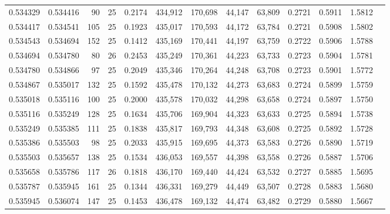 \begin{tabular}{rrrrrrrrrrrrr}
0.534329 & 0.534416 &    90 &  25 &                                     0.2174 & 434,912 & 170,698 &  44,147 &  63,809 & 0.2721 & 0.5911 & 1.5812 \\
0.534417 & 0.534541 &   105 &  25 &                                     0.1923 & 435,017 & 170,593 &  44,172 &  63,784 & 0.2721 & 0.5908 & 1.5802 \\
0.534543 & 0.534694 &   152 &  25 &                                     0.1412 & 435,169 & 170,441 &  44,197 &  63,759 & 0.2722 & 0.5906 & 1.5788 \\
0.534694 & 0.534780 &    80 &  26 &                                     0.2453 & 435,249 & 170,361 &  44,223 &  63,733 & 0.2723 & 0.5904 & 1.5781 \\
0.534780 & 0.534866 &    97 &  25 &                                     0.2049 & 435,346 & 170,264 &  44,248 &  63,708 & 0.2723 & 0.5901 & 1.5772 \\
0.534867 & 0.535017 &   132 &  25 &                                     0.1592 & 435,478 & 170,132 &  44,273 &  63,683 & 0.2724 & 0.5899 & 1.5759 \\
0.535018 & 0.535116 &   100 &  25 &                                     0.2000 & 435,578 & 170,032 &  44,298 &  63,658 & 0.2724 & 0.5897 & 1.5750 \\
0.535116 & 0.535249 &   128 &  25 &                                     0.1634 & 435,706 & 169,904 &  44,323 &  63,633 & 0.2725 & 0.5894 & 1.5738 \\
0.535249 & 0.535385 &   111 &  25 &                                     0.1838 & 435,817 & 169,793 &  44,348 &  63,608 & 0.2725 & 0.5892 & 1.5728 \\
0.535386 & 0.535503 &    98 &  25 &                                     0.2033 & 435,915 & 169,695 &  44,373 &  63,583 & 0.2726 & 0.5890 & 1.5719 \\
0.535503 & 0.535657 &   138 &  25 &                                     0.1534 & 436,053 & 169,557 &  44,398 &  63,558 & 0.2726 & 0.5887 & 1.5706 \\
0.535658 & 0.535786 &   117 &  26 &                                     0.1818 & 436,170 & 169,440 &  44,424 &  63,532 & 0.2727 & 0.5885 & 1.5695 \\
0.535787 & 0.535945 &   161 &  25 &                                     0.1344 & 436,331 & 169,279 &  44,449 &  63,507 & 0.2728 & 0.5883 & 1.5680 \\
0.535945 & 0.536074 &   147 &  25 &                                     0.1453 & 436,478 & 169,132 &  44,474 &  63,482 & 0.2729 & 0.5880 & 1.5667 \\

\end{tabular}
